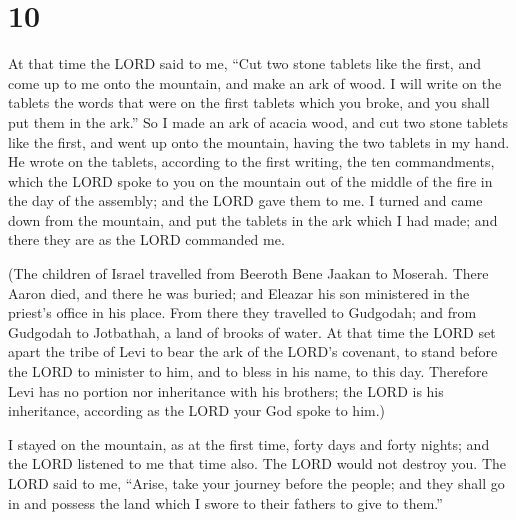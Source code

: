 \hypertarget{section-9}{%
\section{10}\label{section-9}}

 At that time the LORD said to me, ``Cut two stone tablets
like the first, and come up to me onto the mountain, and make an ark of
wood.  I will write on the tablets the words that were on
the first tablets which you broke, and you shall put them in the ark.''
 So I made an ark of acacia wood, and cut two stone
tablets like the first, and went up onto the mountain, having the two
tablets in my hand.  He wrote on the tablets, according to
the first writing, the ten commandments, which the LORD spoke to you on
the mountain out of the middle of the fire in the day of the assembly;
and the LORD gave them to me.  I turned and came down from
the mountain, and put the tablets in the ark which I had made; and there
they are as the LORD commanded me.

 (The children of Israel travelled from Beeroth Bene
Jaakan to Moserah. There Aaron died, and there he was buried; and
Eleazar his son ministered in the priest's office in his place.
 From there they travelled to Gudgodah; and from Gudgodah
to Jotbathah, a land of brooks of water.  At that time the
LORD set apart the tribe of Levi to bear the ark of the LORD's covenant,
to stand before the LORD to minister to him, and to bless in his name,
to this day.  Therefore Levi has no portion nor
inheritance with his brothers; the LORD is his inheritance, according as
the LORD your God spoke to him.)

 I stayed on the mountain, as at the first time, forty
days and forty nights; and the LORD listened to me that time also. The
LORD would not destroy you.  The LORD said to me,
``Arise, take your journey before the people; and they shall go in and
possess the land which I swore to their fathers to give to them.''

